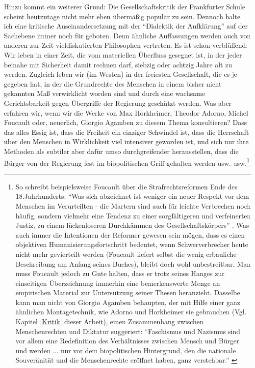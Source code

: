 \documentclass[12pt,a4paper,ngerman]{article}
\begin{document}
Hinzu kommt ein weiterer Grund: Die Gesellschaftskritik der Frankfurter Schule
scheint heutzutage nicht mehr eben übermäßig populär zu sein. Dennoch halte
ich eine kritische Auseinandersetzung mit der "`Dialektik der Aufklärung"' auf
der Sachebene immer noch für geboten. Denn ähnliche Auffassungen werden auch
von anderen zur Zeit vieldiskutierten Philosophen vertreten. Es ist schon
verblüffend: Wir leben in einer Zeit, die vom materiellen Überfluss gesegnet
ist, in der jeder beinahe mit Sicherheit damit rechnen darf, siebzig oder
achtzig Jahre alt zu werden. Zugleich leben wir (im Westen) in der freiesten
Gesellschaft, die es je gegeben hat, in der die Grundrechte des Menschen in
einem bisher nicht gekannten Maß verwirklicht worden sind und durch eine
wachsame Gerichtsbarkeit gegen Übergriffe der Regierung geschützt werden. Was
aber erfahren wir, wenn wir die Werke von Max Horkheimer, Theodor Adorno,
Michel Foucault oder, neuerlich, Giorgio Agamben zu diesem Thema konsultieren?
Dass das alles Essig ist, dass die Freiheit ein einziger Schwindel ist, dass
die Herrschaft über den Menschen in Wirklichkeit viel intensiver geworden ist,
und sich nur ihre Methoden als subtiler aber dafür umso durchgreifender
herausstellen, dass die Bürger von der Regierung fest im biopolitischen Griff
gehalten werden usw. usw.\footnote{So schreibt beispielsweise Foucault über
die Strafrechtsreformen Ende des 18.Jahrhunderts: "`Was sich abzeichnet ist
weniger ein neuer Respekt vor dem Menschen im Verurteilten - die Martern sind
auch für leichte Verbrechen noch häufig, sondern vielmehr eine Tendenz zu
einer sorgfältigeren und verfeinerten Justiz, zu einem lückenloseren
Durchkämmen des Gesellschaftskörpers"' \cite[S. 99]{foucault:1975}. Was auch
immer die Intentionen der Reformer gewesen sein mögen, dass es einen
objektiven Humanisierungsfortschritt bedeutet, wenn Schwerverbrecher heute
nicht mehr gevierteilt werden (Foucault liefert selbst die wenig erbauliche
Beschreibung am Anfang seines Buches), bleibt doch wohl unbestreitbar. Man
muss Foucault jedoch zu Gute halten, dass er trotz seines Hanges zur
einseitigen Überzeichnung immerhin eine bemerkenswerte Menge an empirischen
Material zur Untersützung seiner Thesen heranzieht. Dasselbe kann man nicht
von Giorgio Agamben behaupten, der mit Hilfe einer ganz ähnlichen
Montagetechnik, wie Adorno und Horkheimer sie gebrauchen (Vgl. Kapitel
\ref{Kritik} dieser Arbeit), einen Zusammenhang zwischen Menschenrechten und
Diktatur suggeriert: "`Faschismus und Nazismus sind vor allem eine
Redefinition des Verhältnisses zwischen Mensch und Bürger und werden ... nur
vor dem biopolitischen Hintergrund, den die nationale Souveränität und die
Menschenrechte eröffnet haben, ganz verstehbar."'
\cite[S. 139]{agamben:1995}}
\end{document}

